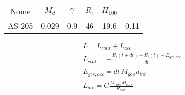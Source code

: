 \begin{workout}
	\begin{table}[!ht]
		\begin{tabular}{|cccccc|}
			Nome&$M_d$&$\gamma$&$R_c$&$H_{100}$&\\
			AS 205&0.029&0.9&46&19.6&0.11\\
		\end{tabular}
	\end{table}
\end{workout}


\begin{workout}
	\begin{align}
		&L=L_{cont}+L_{acc}\\
		&L_{cont}=-\frac{E_t(t+dt)-E_t(t)-E_{gas,acc}}{dt}\\
		&E_{gas,acc}=dt\,\dot{M}_{gas}u_{int}\\
		&L_{acc}=G\frac{\dot{M}_{core}M_{core}}{R_{core}}
	\end{align}
\end{workout}

\vspace{0.2\textheight}